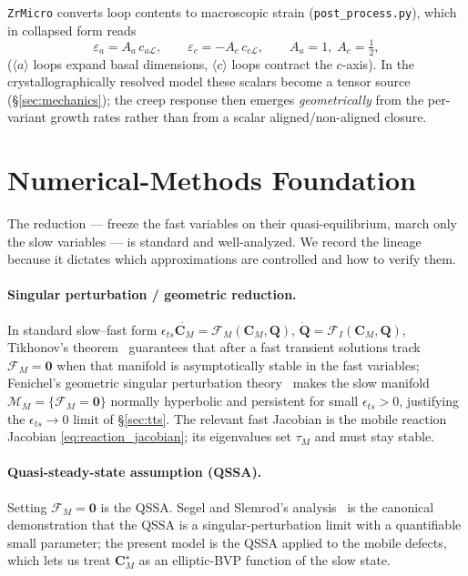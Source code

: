 \documentclass[11pt]{article}
\newcommand{\CM}{\mathbf{C}_{M}}
\newcommand{\eps}{\varepsilon}
\newcommand{\Lcal}{\mathcal{L}}
\newcommand{\ZrMicro}{\texttt{ZrMicro}}
\newcommand{\code}[1]{\texttt{#1}}
\begin{document}
\ZrMicro{} converts loop contents to macroscopic strain (\code{post\_process.py}),
which in collapsed form reads
\begin{equation}
\label{eq:zr_growth}
    \eps_a = A_a\,c_{a\Lcal},
    \qquad
    \eps_c = -A_c\,c_{c\Lcal},
    \qquad A_a=1,\;A_c=\tfrac12,
\end{equation}
($\langle a\rangle$ loops expand basal dimensions, $\langle c\rangle$ loops
contract the $c$-axis). In the crystallographically resolved model these scalars
become a tensor source (\S\ref{sec:mechanics}); the creep response then emerges
\emph{geometrically} from the per-variant growth rates rather than from a scalar
aligned/non-aligned closure.

\section{Numerical-Methods Foundation}
\label{sec:literature}

The reduction --- freeze the fast variables on their quasi-equilibrium, march only
the slow variables --- is standard and well-analyzed. We record the lineage because
it dictates which approximations are controlled and how to verify them.

\paragraph{Singular perturbation / geometric reduction.}
In standard slow--fast form
$\epsilon_{ts}\dot{\CM}=\mathcal F_M(\CM,\mathbf Q)$,
$\dot{\mathbf Q}=\mathcal F_I(\CM,\mathbf Q)$,
Tikhonov's theorem~\cite{Tikhonov1952} guarantees that after a fast transient
solutions track $\mathcal F_M=\mathbf0$ when that manifold is asymptotically
stable in the fast variables; Fenichel's geometric singular perturbation
theory~\cite{Fenichel1979} makes the slow manifold
$\mathcal M_M=\{\mathcal F_M=\mathbf0\}$ normally hyperbolic and persistent for
small $\epsilon_{ts}>0$, justifying the $\epsilon_{ts}\to0$ limit of
\S\ref{sec:tts}. The relevant fast Jacobian is the mobile reaction Jacobian
\eqref{eq:reaction_jacobian}; its eigenvalues set $\tau_M$ and must stay stable.

\paragraph{Quasi-steady-state assumption (QSSA).}
Setting $\mathcal F_M=\mathbf0$ is the QSSA. Segel and
Slemrod's analysis~\cite{SegelSlemrod1989} is the canonical demonstration that
the QSSA is a singular-perturbation limit with a quantifiable small parameter;
the present model is the QSSA applied to the mobile defects, which lets us treat
$\CM^\star$ as an elliptic-BVP function of the slow state.
\end{document}

